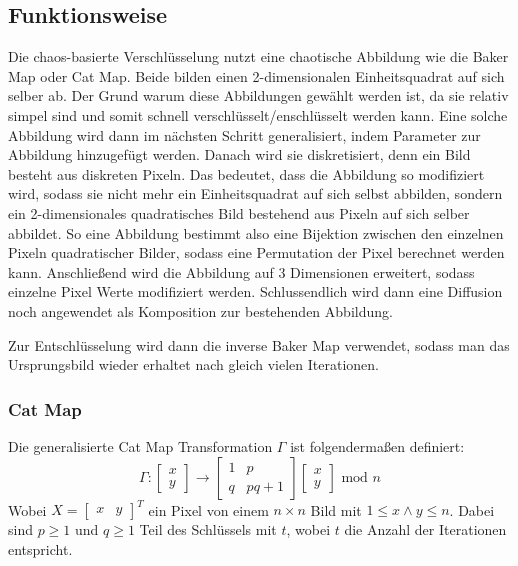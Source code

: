 \subsection{Funktionsweise} %
Die chaos-basierte Verschlüsselung nutzt eine chaotische Abbildung wie die Baker Map oder Cat Map. Beide bilden
einen 2-dimensionalen Einheitsquadrat auf sich selber ab. Der Grund warum diese Abbildungen gewählt werden ist, da
sie relativ simpel sind und somit schnell verschlüsselt/enschlüsselt werden kann. 
Eine solche Abbildung wird dann im nächsten Schritt generalisiert, indem Parameter zur Abbildung hinzugefügt werden.
Danach wird sie diskretisiert, denn ein Bild besteht aus diskreten Pixeln. Das bedeutet, dass die Abbildung so
modifiziert wird, sodass sie nicht mehr ein Einheitsquadrat auf sich selbst abbilden, sondern ein 2-dimensionales quadratisches
Bild bestehend aus Pixeln auf sich selber abbildet. So eine Abbildung bestimmt also eine Bijektion zwischen den einzelnen Pixeln
quadratischer Bilder, sodass eine Permutation der Pixel berechnet werden kann. Anschließend wird die Abbildung auf 3 Dimensionen erweitert,
sodass einzelne Pixel Werte modifiziert werden. Schlussendlich wird dann eine Diffusion noch angewendet als Komposition zur bestehenden
Abbildung.
\cite{IEEEMap}

Zur Entschlüsselung wird dann die inverse Baker Map verwendet, sodass man das Ursprungsbild wieder erhaltet nach gleich vielen Iterationen.

\subsubsection{Cat Map}
Die generalisierte Cat Map Transformation $\Gamma$ ist folgendermaßen definiert:
$$
	\Gamma:
	\begin{bmatrix} x \\ y \end{bmatrix} \rightarrow
	\begin{bmatrix} 1 & p \\ q & pq + 1 \end{bmatrix}
	\begin{bmatrix} x \\ y \end{bmatrix} \text{ mod } n
$$
Wobei $X = \begin{bmatrix} x & y \end{bmatrix}^T$ ein Pixel von einem $n \times n$ Bild mit $1 \leq x \land y \leq n$.
Dabei sind $p \geq 1$ und $q \geq 1$ Teil des Schlüssels mit $t$, wobei $t$ die Anzahl der Iterationen entspricht. \cite{chaos}

